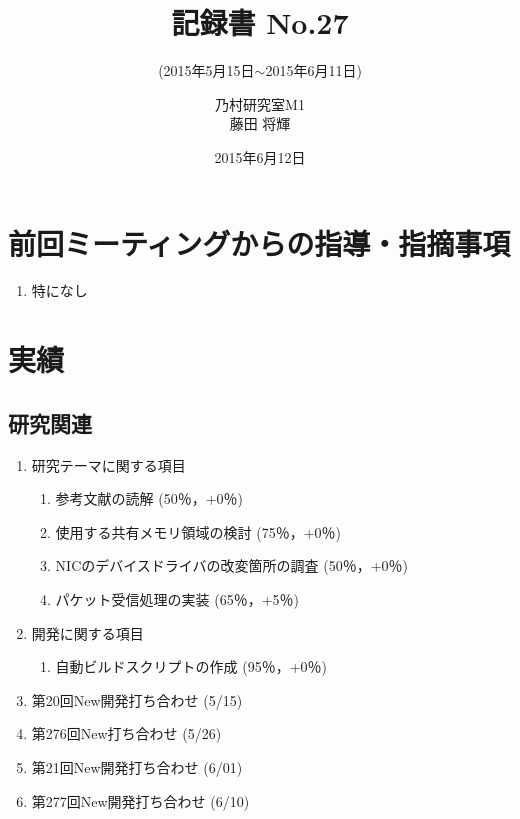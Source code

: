 \documentclass[fleqn, 14pt]{extarticle}
\subtitle{(2015年5月15日$\sim$2015年6月11日)}
\author{乃村研究室M1\\藤田 将輝}
\date{2015年6月12日}
\title{記録書 No.27}
\begin{document}
\maketitle
\section{前回ミーティングからの指導・指摘事項}
\label{sec-1}
\begin{enumerate}
\item 特になし
\newline
\hfill

\end{enumerate}

\section{実績}
\label{sec-2}

\subsection{研究関連}
\label{sec-2-1}
\begin{enumerate}
    \item 研究テーマに関する項目
    \hfill
    \label{enum-research1}
    \begin{enumerate}

        \item 参考文献の読解
        \hfill
        \label{enum-1-A}
        (50％，+0％)
        \item 使用する共有メモリ領域の検討
        \hfill
        \label{enum-1-B}
        (75％，+0％)
        \item NICのデバイスドライバの改変箇所の調査
        \hfill
        \label{enum-1-C}
        (50％，+0％)
        \item パケット受信処理の実装
        \hfill
        \label{enum-1-D}
        (65％，+5％)

    \end{enumerate}
    \item 開発に関する項目
    \hfill
    \label{enum-research2}
    \begin{enumerate}

        \item 自動ビルドスクリプトの作成
        \hfill
        \label{enum-2-A}
        (95％，+0％)
    \end{enumerate}

    \item 第20回New開発打ち合わせ
    \hfill
    \label{enum-research3}
    (5/15)
    \item 第276回New打ち合わせ 
    \hfill
    \label{enum-research3}
    (5/26)
    \item 第21回New開発打ち合わせ 
    \hfill
    \label{enum-research3}
    (6/01)
    \item 第277回New開発打ち合わせ
    \hfill
    \label{enum-research3}
    (6/10)
    \end{enumerate}
\end{document}
